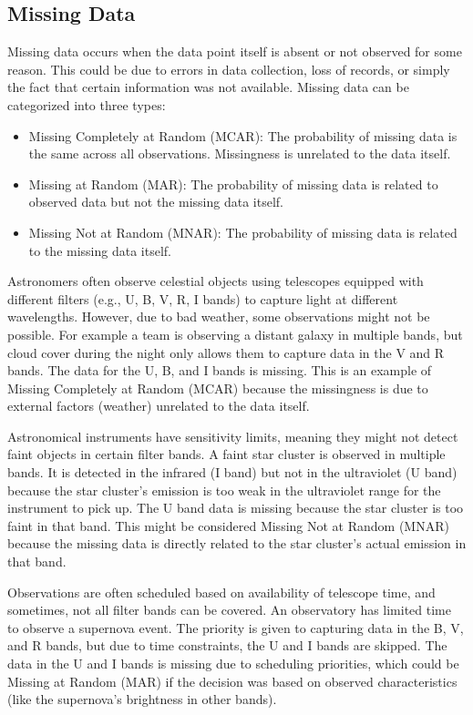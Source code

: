 \documentclass[a4paper, 15pt,usenatbib]{article}
\begin{document}
\subsection{Missing Data}

Missing data occurs when the data point itself is absent or not observed for some reason. This could be due to errors in data collection, loss of records, or simply the fact that certain information was not available. Missing data can be categorized into three types:


\begin{itemize}
    \item Missing Completely at Random (MCAR): The probability of missing data is the same across all observations. Missingness is unrelated to the data itself.

    \item Missing at Random (MAR): The probability of missing data is related to observed data but not the missing data itself.

    \item Missing Not at Random (MNAR): The probability of missing data is related to the missing data itself.
\end{itemize}

Astronomers often observe celestial objects using telescopes equipped with different filters (e.g., U, B, V, R, I bands) to capture light at different wavelengths. However, due to bad weather, some observations might not be possible. For example a team is observing a distant galaxy in multiple bands, but cloud cover during the night only allows them to capture data in the V and R bands. The data for the U, B, and I bands is missing. This is an example of Missing Completely at Random (MCAR) because the missingness is due to external factors (weather) unrelated to the data itself.

Astronomical instruments have sensitivity limits, meaning they might not detect faint objects in certain filter bands. A faint star cluster is observed in multiple bands. It is detected in the infrared (I band) but not in the ultraviolet (U band) because the star cluster’s emission is too weak in the ultraviolet range for the instrument to pick up. The U band data is missing because the star cluster is too faint in that band. This might be considered Missing Not at Random (MNAR) because the missing data is directly related to the star cluster's actual emission in that band.

Observations are often scheduled based on availability of telescope time, and sometimes, not all filter bands can be covered. An observatory has limited time to observe a supernova event. The priority is given to capturing data in the B, V, and R bands, but due to time constraints, the U and I bands are skipped. The data in the U and I bands is missing due to scheduling priorities, which could be Missing at Random (MAR) if the decision was based on observed characteristics (like the supernova’s brightness in other bands).
\end{document}
